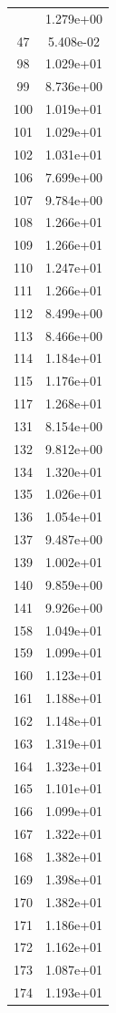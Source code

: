 \documentclass[12pt]{article}
\begin{document}
\begin{longtable}{@{}cc@{}}
\bottomrule
\endlastfoot
41 & 1.279e+00 \\
47 & 5.408e-02 \\
98 & 1.029e+01 \\
99 & 8.736e+00 \\
100 & 1.019e+01 \\
101 & 1.029e+01 \\
102 & 1.031e+01 \\
106 & 7.699e+00 \\
107 & 9.784e+00 \\
108 & 1.266e+01 \\
109 & 1.266e+01 \\
110 & 1.247e+01 \\
111 & 1.266e+01 \\
112 & 8.499e+00 \\
113 & 8.466e+00 \\
114 & 1.184e+01 \\
115 & 1.176e+01 \\
117 & 1.268e+01 \\
131 & 8.154e+00 \\
132 & 9.812e+00 \\
134 & 1.320e+01 \\
135 & 1.026e+01 \\
136 & 1.054e+01 \\
137 & 9.487e+00 \\
139 & 1.002e+01 \\
140 & 9.859e+00 \\
141 & 9.926e+00 \\
158 & 1.049e+01 \\
159 & 1.099e+01 \\
160 & 1.123e+01 \\
161 & 1.188e+01 \\
162 & 1.148e+01 \\
163 & 1.319e+01 \\
164 & 1.323e+01 \\
165 & 1.101e+01 \\
166 & 1.099e+01 \\
167 & 1.322e+01 \\
168 & 1.382e+01 \\
169 & 1.398e+01 \\
170 & 1.382e+01 \\
171 & 1.186e+01 \\
172 & 1.162e+01 \\
173 & 1.087e+01 \\
174 & 1.193e+01 \\

\end{longtable}
\end{document}
